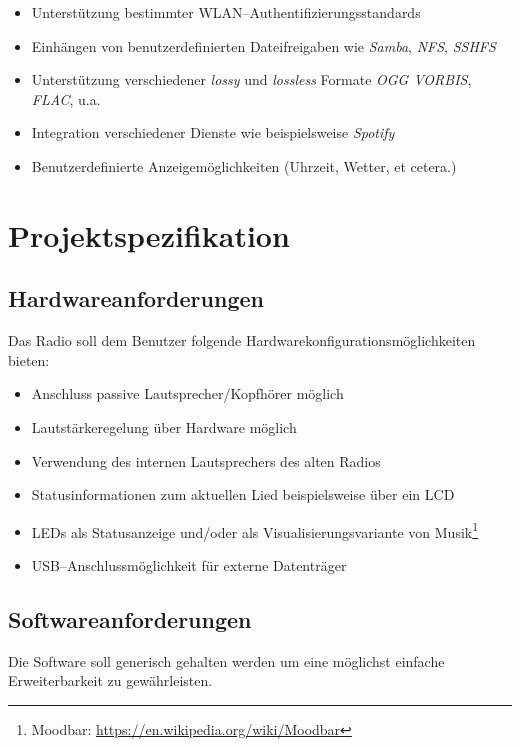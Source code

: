 \documentclass[11pt,ngerman,toc=listof,index=totoc]{scrreprt}
\providecommand{\tightlist}{%
  \setlength{\itemsep}{0pt}\setlength{\parskip}{0pt}}
\begin{document}
\begin{itemize}
\tightlist
\item
  Unterstützung bestimmter WLAN--Authentifizierungsstandards
\item
  Einhängen von benutzerdefinierten Dateifreigaben wie \emph{Samba},
  \emph{NFS}, \emph{SSHFS}
\item
  Unterstützung verschiedener \emph{lossy} und \emph{lossless} Formate
  \emph{OGG VORBIS}, \emph{FLAC}, u.a.
\item
  Integration verschiedener Dienste wie beispielsweise \emph{Spotify}
\item
  Benutzerdefinierte Anzeigemöglichkeiten (Uhrzeit, Wetter, et cetera.)
\end{itemize}

\chapter{Projektspezifikation}\label{projektspezifikation}

\section{Hardwareanforderungen}\label{hardwareanforderungen}

Das Radio soll dem Benutzer folgende Hardwarekonfigurationsmöglichkeiten
bieten:

\begin{itemize}
\tightlist
\item
  Anschluss passive Lautsprecher/Kopfhörer möglich
\item
  Lautstärkeregelung über Hardware möglich
\item
  Verwendung des internen Lautsprechers des alten Radios
\item
  Statusinformationen zum aktuellen Lied beispielsweise über ein LCD
\item
  LEDs als Statusanzeige und/oder als Visualisierungsvariante von
  Musik\footnote{Moodbar: \url{https://en.wikipedia.org/wiki/Moodbar}}
\item
  USB--Anschlussmöglichkeit für externe Datenträger
\end{itemize}

\section{Softwareanforderungen}\label{softwareanforderungen}

Die Software soll generisch gehalten werden um eine möglichst einfache
Erweiterbarkeit zu gewährleisten.
\end{document}
